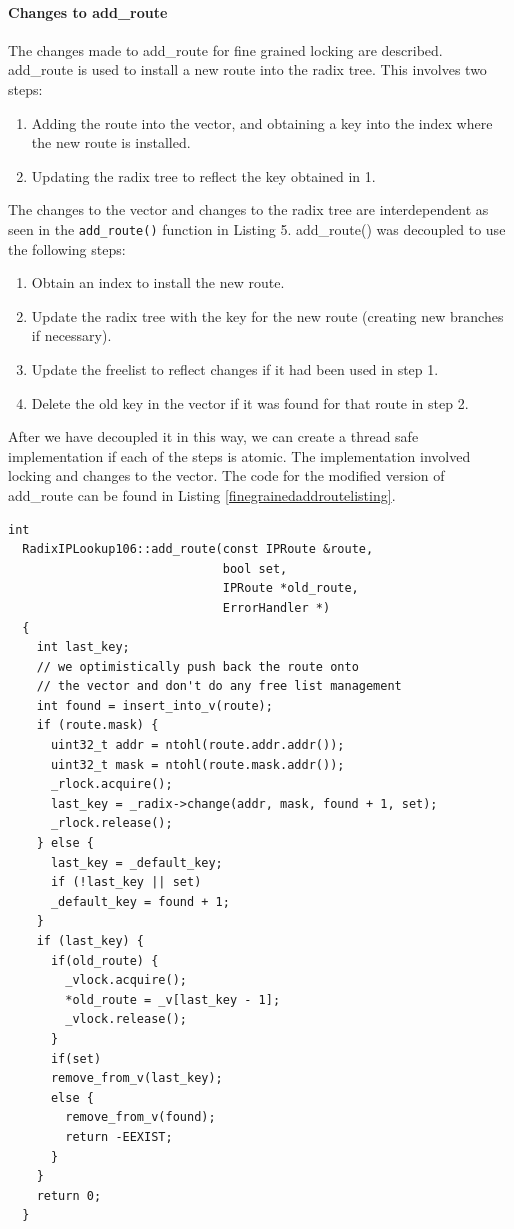 \documentclass[a4paper,marginparwidth=50pt,marginparsep=10pt]{article}
\begin{document}
\paragraph{Changes to add\_route}
The changes made to add\_route for fine grained locking are described.
add\_route is used to install a new route into the radix tree. This involves two steps:
\begin{enumerate}
\item Adding the route into the vector, and obtaining a key into the index where the new route is installed.
\item Updating the radix tree to reflect the key obtained in 1.
\end{enumerate}
The changes to the vector and changes to the radix tree are interdependent as seen in the \verb+add_route()+ function in Listing 5.
add\_route() was decoupled to use the following steps:
\begin{enumerate}
\item  Obtain an index to install the new route.
\item Update the radix tree with the key for the new route 
(creating new branches if necessary).
\item Update the freelist to reflect changes if it had been used in step 1.
\item Delete the old key in the vector if it was found for that route in step 2.
\end{enumerate}
After we have decoupled it in this way, we can create a thread safe implementation if each of the steps is atomic. The implementation involved locking and changes to the vector. The code for the modified version of add\_route can be found in Listing \ref{finegrainedaddroutelisting}.
\begin{lstlisting}[caption=Fine-grained add\_route(), label=finegrainedaddroutelisting,float=tph]
  int
  RadixIPLookup106::add_route(const IPRoute &route, 
                              bool set, 
                              IPRoute *old_route, 
                              ErrorHandler *)
  {
    int last_key;
    // we optimistically push back the route onto
    // the vector and don't do any free list management
    int found = insert_into_v(route);
    if (route.mask) {
      uint32_t addr = ntohl(route.addr.addr());
      uint32_t mask = ntohl(route.mask.addr());
      _rlock.acquire();
      last_key = _radix->change(addr, mask, found + 1, set);
      _rlock.release();
    } else {
      last_key = _default_key;
      if (!last_key || set)
      _default_key = found + 1;
    }
    if (last_key) { 
      if(old_route) { 
        _vlock.acquire();
        *old_route = _v[last_key - 1];
        _vlock.release();
      }
      if(set)
      remove_from_v(last_key);
      else {
        remove_from_v(found);
        return -EEXIST;
      }
    }
    return 0;
  }
\end{lstlisting}
\end{document}
